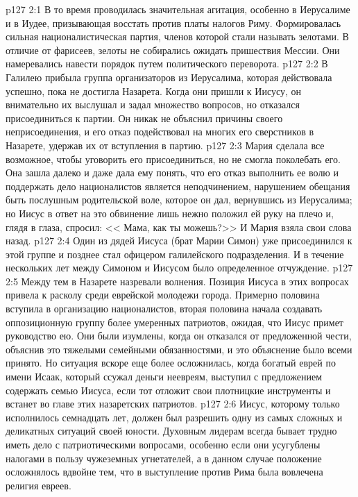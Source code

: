 \vs p127 2:1 В то время проводилась значительная агитация, особенно в Иерусалиме и в Иудее, призывающая восстать против платы налогов Риму. Формировалась сильная националистическая партия, членов которой стали называть зелотами. В отличие от фарисеев, зелоты не собирались ожидать пришествия Мессии. Они намеревались навести порядок путем политического переворота.
\vs p127 2:2 В Галилею прибыла группа организаторов из Иерусалима, которая действовала успешно, пока не достигла Назарета. Когда они пришли к Иисусу, он внимательно их выслушал и задал множество вопросов, но отказался присоединиться к партии. Он никак не объяснил причины своего неприсоединения, и его отказ подействовал на многих его сверстников в Назарете, удержав их от вступления в партию.
\vs p127 2:3 Мария сделала все возможное, чтобы уговорить его присоединиться, но не смогла поколебать его. Она зашла далеко и даже дала ему понять, что его отказ выполнить ее волю и поддержать дело националистов является неподчинением, нарушением обещания быть послушным родительской воле, которое он дал, вернувшись из Иерусалима; но Иисус в ответ на это обвинение лишь нежно положил ей руку на плечо и, глядя в глаза, спросил: << Мама, как ты можешь?>> И Мария взяла свои слова назад.
\vs p127 2:4 Один из дядей Иисуса (брат Марии Симон) уже присоединился к этой группе и позднее стал офицером галилейского подразделения. И в течение нескольких лет между Симоном и Иисусом было определенное отчуждение.
\vs p127 2:5 Между тем в Назарете назревали волнения. Позиция Иисуса в этих вопросах привела к расколу среди еврейской молодежи города. Примерно половина вступила в организацию националистов, вторая половина начала создавать оппозиционную группу более умеренных патриотов, ожидая, что Иисус примет руководство ею. Они были изумлены, когда он отказался от предложенной чести, объяснив это тяжелыми семейными обязанностями, и это объяснение было всеми принято. Но ситуация вскоре еще более осложнилась, когда богатый еврей по имени Исаак, который ссужал деньги неевреям, выступил с предложением содержать семью Иисуса, если тот отложит свои плотницкие инструменты и встанет во главе этих назаретских патриотов.
\vs p127 2:6 Иисус, которому только исполнилось семнадцать лет, должен был разрешить одну из самых сложных и деликатных ситуаций своей юности. Духовным лидерам всегда бывает трудно иметь дело с патриотическими вопросами, особенно если они усугублены налогами в пользу чужеземных угнетателей, а в данном случае положение осложнялось вдвойне тем, что в выступление против Рима была вовлечена религия евреев.
